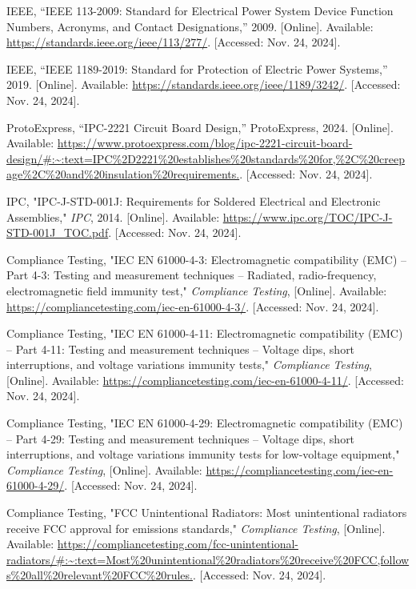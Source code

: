 \begin{thebibliography}{45}
	IEEE, ``IEEE 113-2009: Standard for Electrical Power System Device Function Numbers, Acronyms, and Contact Designations,'' 2009. [Online]. Available: \url{https://standards.ieee.org/ieee/113/277/}. [Accessed: Nov. 24, 2024].
	
	IEEE, ``IEEE 1189-2019: Standard for Protection of Electric Power Systems,'' 2019. [Online]. Available: \url{https://standards.ieee.org/ieee/1189/3242/}. [Accessed: Nov. 24, 2024].
	
	ProtoExpress, ``IPC-2221 Circuit Board Design,'' ProtoExpress, 2024. [Online]. Available: \url{https://www.protoexpress.com/blog/ipc-2221-circuit-board-design/#:~:text=IPC%2D2221%20establishes%20standards%20for,%2C%20creepage%2C%20and%20insulation%20requirements.}. [Accessed: Nov. 24, 2024].
	
	IPC, "IPC-J-STD-001J: Requirements for Soldered Electrical and Electronic Assemblies," \textit{IPC}, 2014. [Online]. Available: \url{https://www.ipc.org/TOC/IPC-J-STD-001J_TOC.pdf}. [Accessed: Nov. 24, 2024].
	
	Compliance Testing, "IEC EN 61000-4-3: Electromagnetic compatibility (EMC) – Part 4-3: Testing and measurement techniques – Radiated, radio-frequency, electromagnetic field immunity test," \textit{Compliance Testing}, [Online]. Available: \url{https://compliancetesting.com/iec-en-61000-4-3/}. [Accessed: Nov. 24, 2024].
	
	Compliance Testing, "IEC EN 61000-4-11: Electromagnetic compatibility (EMC) – Part 4-11: Testing and measurement techniques – Voltage dips, short interruptions, and voltage variations immunity tests," \textit{Compliance Testing}, [Online]. Available: \url{https://compliancetesting.com/iec-en-61000-4-11/}. [Accessed: Nov. 24, 2024].
	
	Compliance Testing, "IEC EN 61000-4-29: Electromagnetic compatibility (EMC) – Part 4-29: Testing and measurement techniques – Voltage dips, short interruptions, and voltage variations immunity tests for low-voltage equipment," \textit{Compliance Testing}, [Online]. Available: \url{https://compliancetesting.com/iec-en-61000-4-29/}. [Accessed: Nov. 24, 2024].
	
	Compliance Testing, "FCC Unintentional Radiators: Most unintentional radiators receive FCC approval for emissions standards," \textit{Compliance Testing}, [Online]. Available: \url{https://compliancetesting.com/fcc-unintentional-radiators/#:~:text=Most%20unintentional%20radiators%20receive%20FCC,follows%20all%20relevant%20FCC%20rules.}. [Accessed: Nov. 24, 2024].
	

\end{thebibliography}

